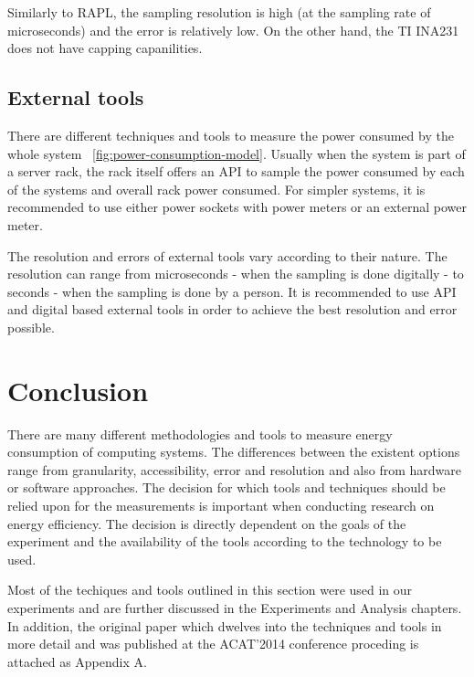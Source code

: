Similarly to RAPL, the sampling resolution is high (at the sampling rate of microseconds) and the error is relatively low. On the other hand, the TI INA231 does not have capping capanilities.


\subsection*{External tools}

There are different techniques and tools to measure the power consumed by the whole system ~\ref{fig:power-consumption-model}. Usually when the system is part of a server rack, the rack itself offers an API to sample the power consumed by each of the systems and overall rack power consumed. For simpler systems, it is recommended to use either power sockets with power meters or an external power meter. 

The resolution and errors of external tools vary according to their nature. The resolution can range from microseconds - when the sampling is done digitally - to seconds - when the sampling is done by a person. It is recommended to use API and digital based external tools in order to achieve the best resolution and error possible. 



\section*{Conclusion}
There are many different methodologies and tools to measure energy consumption of computing systems. The differences between the existent options range from granularity, accessibility, error and resolution and also from hardware or software approaches. The decision for which tools and techniques should be relied upon for the measurements is important when conducting research on energy efficiency. The decision is directly dependent on the goals of the experiment and the availability of the tools according to the technology to be used. 

Most of the techiques and tools outlined in this section were used in our experiments and are further discussed in the Experiments and Analysis chapters. In addition, the original paper which dwelves into the techniques and tools in more detail and was published at the ACAT'2014 conference proceding is attached as Appendix A.